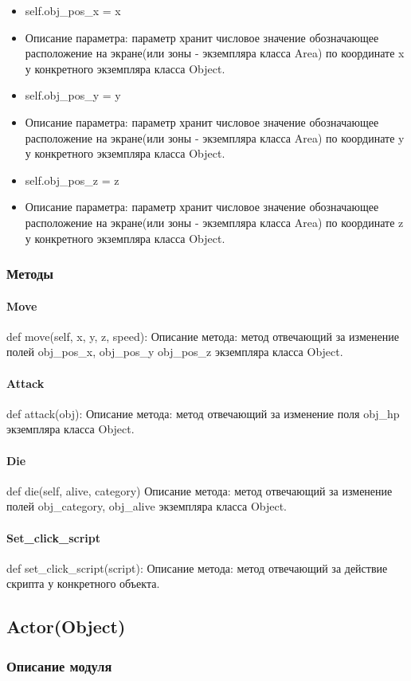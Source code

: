 \begin{itemize}
	\item self.obj\_pos\_x = x 
	\item Описание параметра: параметр хранит числовое значение обозначающее расположение на экране(или зоны - экземпляра класса Area) по координате x у конкретного экземпляра класса Object.
	\item self.obj\_pos\_y = y  
	\item Описание параметра: параметр хранит числовое значение обозначающее расположение на экране(или зоны - экземпляра класса Area) по координате y у конкретного экземпляра класса Object.
	\item self.obj\_pos\_z = z 
	\item Описание параметра: параметр хранит числовое значение обозначающее расположение на экране(или зоны - экземпляра класса Area) по координате z у конкретного экземпляра класса Object.
\end{itemize}
\subsubsection{Методы}
\paragraph{Move}
def move(self, x, y, z, speed):
Описание метода: метод отвечающий за изменение полей obj\_pos\_x, obj\_pos\_y obj\_pos\_z экземпляра класса Object.
\paragraph{Attack}
 def attack(obj):
Описание метода: метод отвечающий за изменение поля obj\_hp экземпляра класса Object.
\paragraph{Die}
def die(self, alive, category)
Описание метода: метод отвечающий за изменение полей obj\_category, obj\_alive экземпляра класса Object.
\paragraph{Set\_click\_script}
def set\_click\_script(script):
Описание метода: метод отвечающий за действие скрипта у конкретного объекта.

\subsection{Actor(Object)}
\subsubsection{Описание модуля}
